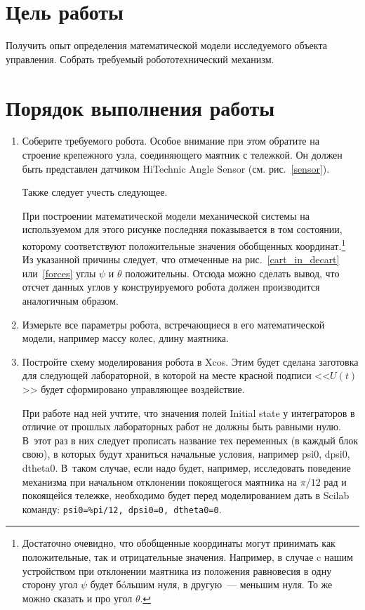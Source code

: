 \newpage
\section{Цель работы}
\hspace*{\parindent}Получить опыт определения математической модели исследуемого объекта управления.
Собрать требуемый робототехнический механизм.

\section{Порядок выполнения работы}
\begin{enumerate}
	\item Соберите требуемого робота. Особое внимание при этом обратите на строение крепежного узла, соединяющего маятник с тележкой. Он должен быть представлен датчиком HiTechnic Angle Sensor (см. рис.~\ref{sensor}).
	
	Также следует учесть следующее. 
	
	При построении математической модели механической системы на используемом для этого рисунке последняя показывается в том состоянии, которому соответствуют положительные значения обобщенных координат\lefteqn.\footnote{Достаточно очевидно, что обобщенные координаты могут принимать как положительные, так и отрицательные значения. Например, в случае c нашим устройством при отклонении маятника из положения равновесия в одну сторону угол $\psi$ будет б\'oльшим нуля, в другую~--- меньшим нуля. То же можно сказать и про угол $\theta$.} Из указанной причины следует, что отмеченные на рис.~\ref{cart_in_decart} или~\ref{forces} углы $\psi$ и $\theta$ положительны. Отсюда можно сделать вывод, что отсчет данных углов у конструируемого робота должен производится аналогичным образом. 
	\item Измерьте все параметры робота, встречающиеся в его математической модели, например массу колес, длину маятника. 
	\item Постройте схему моделирования робота в Xcos. Этим будет сделана заготовка для следующей лабораторной, в которой на месте красной подписи <<$U(t)$>> будет сформировано управляющее воздействие. 
	
	При работе над ней учтите, что значения полей Initial state у интеграторов в отличие от прошлых лабораторных работ не должны быть равными нулю. В~этот раз в них следует прописать название тех переменных (в каждый блок свою), в которых будут храниться начальные условия, например psi0, dpsi0, dtheta0. В~таком случае, если надо будет, например, исследовать поведение механизма при начальном отклонении покоящегося маятника на $\pi/12 \text{ рад}$ и покоящейся тележке, необходимо будет перед моделированием дать в Scilab команду: \verb|psi0=%pi/12, dpsi0=0, dtheta0=0|. 
\end{enumerate}

